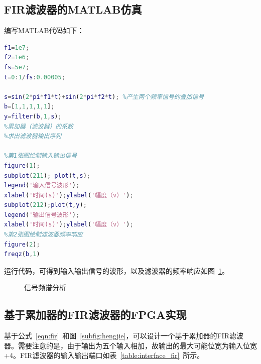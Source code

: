 \documentclass[lang=cn,newtx,10pt,scheme=chinese]{elegantbook}
\begin{document}
\subsection{FIR滤波器的MATLAB仿真}
编写MATLAB代码如下：
\begin{lstlisting}[language=matlab]
f1=1e7;
f2=1e6;
fs=5e7;
t=0:1/fs:0.00005;

s=sin(2*pi*f1*t)+sin(2*pi*f2*t); %产生两个频率信号的叠加信号
b=[1,1,1,1,1];
y=filter(b,1,s);
%累加器（滤波器）的系数
%求出滤波器输出序列

%第1张图绘制输入输出信号
figure(1);
subplot(211); plot(t,s);
legend('输入信号波形');
xlabel('时间(s)');ylabel('幅度（v）');
subplot(212);plot(t,y);
legend('输出信号波形');
xlabel('时间(s)');ylabel('幅度（v）');
%第2张图绘制滤波器频率响应
figure(2);
freqz(b,1)
\end{lstlisting}
运行代码，可得到输入输出信号的波形，以及滤波器的频率响应如图~\ref{fig:exp4:matlab}。
\begin{figure}[htbp]
  \centering
  \hfill
  \caption{信号频谱分析}
  \label{fig:exp4:matlab}
\end{figure}
\subsection{基于累加器的FIR滤波器的FPGA实现}
基于公式~\ref{eqn:fir}~和图~\ref{subfig:hengjie}，可以设计一个基于累加器的FIR滤波器。需要注意的是，由于输出为五个输入相加，故输出的最大可能位宽为输入位宽+4。FIR滤波器的输入输出端口如表~\ref{table:interface_fir}~所示。
\end{document}
